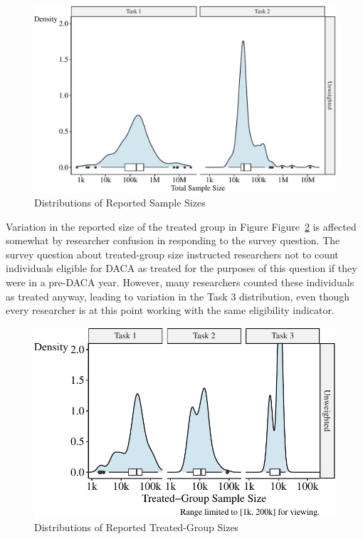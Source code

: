\documentclass[
  letterpaper,
  DIV=11,
  numbers=noendperiod]{scrartcl}
\begin{document}
\begin{figure}

{\centering \includegraphics{The-Sources-of-Researcher-Variation-in-Economics_files/figure-pdf/fig-sample-size-distributions-1.pdf}

}

\caption{\label{fig-sample-size-distributions}Distributions of Reported
Sample Sizes}

\end{figure}

Variation in the reported size of the treated group in Figure
Figure~\ref{fig-treated-group-distributions} is affected somewhat by
researcher confusion in responding to the survey question. The survey
question about treated-group size instructed researchers not to count
individuals eligible for DACA as treated for the purposes of this
question if they were in a pre-DACA year. However, many researchers
counted these individuals as treated anyway, leading to variation in the
Task 3 distribution, even though every researcher is at this point
working with the same eligibility indicator.

\begin{figure}

{\centering \includegraphics{The-Sources-of-Researcher-Variation-in-Economics_files/figure-pdf/fig-treated-group-distributions-1.pdf}

}

\caption{\label{fig-treated-group-distributions}Distributions of
Reported Treated-Group Sizes}

\end{figure}
\end{document}
